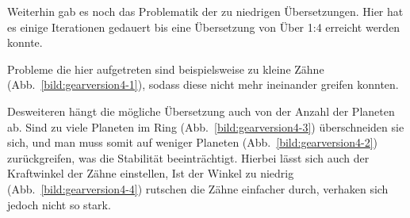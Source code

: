 Weiterhin gab es noch das Problematik der zu niedrigen Übersetzungen. 
Hier hat es einige Iterationen gedauert bis eine Übersetzung von Über 1:4 erreicht werden konnte.

Probleme die hier aufgetreten sind beispielsweise zu kleine Zähne (Abb.~\ref{bild:gearversion4-1}), sodass diese nicht mehr ineinander greifen konnten.

Desweiteren hängt die mögliche Übersetzung auch von der Anzahl der Planeten ab. 
Sind zu viele Planeten im Ring (Abb.~\ref{bild:gearversion4-3}) überschneiden sie sich, und man muss somit auf weniger Planeten (Abb.~\ref{bild:gearversion4-2}) zurückgreifen, was die Stabilität beeinträchtigt.
Hierbei lässt sich auch der Kraftwinkel der Zähne einstellen, Ist der Winkel zu niedrig (Abb.~\ref{bild:gearversion4-4}) rutschen die Zähne einfacher durch, verhaken sich jedoch nicht so stark.

